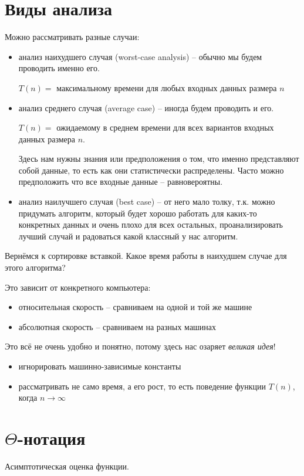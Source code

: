 \documentclass[a4paper,11pt]{article}
\begin{document}
\section{Виды анализа}
Можно рассматривать разные случаи:

\begin{itemize}
\item анализ наихудшего случая (worst-case analysis) -- обычно мы будем
  проводить именно его.

  $T(n) = $ максимальному времени для любых входных данных размера $n$

\item анализ среднего случая (average case) -- иногда будем проводить и его.

  $T(n) = $ ожидаемому в среднем времени для всех вариантов входных данных
  размера $n$.

  Здесь нам нужны знания или предположения о том, что именно представляют собой
  данные, то есть как они статистически распределены. Часто можно предположить
  что все входные данные -- равновероятны.

\item анализ наилучшего случая (best case) -- от него мало толку, т.к. можно
  придумать алгоритм, который будет хорошо работать для каких-то конкретных
  данных и очень плохо для всех остальных, проанализировать лучший случай и
  радоваться какой классный у нас алгоритм.
\end{itemize}

Вернёмся к сортировке вставкой. Какое время работы в наихудшем случае для этого
алгоритма?

Это зависит от конкретного компьютера:
\begin{itemize}
\item относительная скорость -- сравниваем на одной и той же машине
\item абсолютная скорость -- сравниваем на разных машинах
\end{itemize}

Это всё не очень удобно и понятно, потому здесь нас озаряет \emph{великая идея}!
\begin{itemize}
\item игнорировать машинно-зависимые константы
\item рассматривать не само время, а его рост, то есть поведение функции
  $T(n)$, когда $n \rightarrow \infty$
\end{itemize}

\section{$\Theta$-нотация}
Асимптотическая оценка функции.
\end{document}
